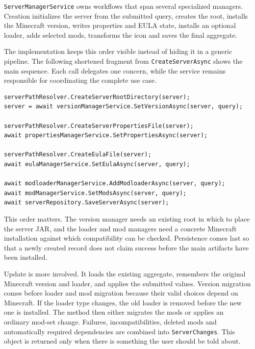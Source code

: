 \texttt{ServerManagerService} owns workflows that span several specialized managers. Creation initializes the server from the submitted query, creates the root, installs the Minecraft version, writes properties and EULA state, installs an optional loader, adds selected mods, transforms the icon and saves the final aggregate.

The implementation keeps this order visible instead of hiding it in a generic pipeline. The following shortened fragment from \texttt{CreateServerAsync} shows the main sequence. Each call delegates one concern, while the service remains responsible for coordinating the complete use case.

\begin{footnotesize}
\begin{verbatim}
serverPathResolver.CreateServerRootDirectory(server);
server = await versionManagerService.SetVersionAsync(server, query);

serverPathResolver.CreateServerPropertiesFile(server);
await propertiesManagerService.SetPropertiesAsync(server);

serverPathResolver.CreateEulaFile(server);
await eulaManagerService.SetEulaAsync(server, query);

await modloaderManagerService.AddModloaderAsync(server, query);
await modManagerService.SetModsAsync(server, query);
await serverRepository.SaveServerAsync(server);
\end{verbatim}
\end{footnotesize}

This order matters. The version manager needs an existing root in which to place the server JAR, and the loader and mod managers need a concrete Minecraft installation against which compatibility can be checked. Persistence comes last so that a newly created record does not claim success before the main artifacts have been installed.

Update is more involved. It loads the existing aggregate, remembers the original Minecraft version and loader, and applies the submitted values. Version migration comes before loader and mod migration because their valid choices depend on Minecraft. If the loader type changes, the old loader is removed before the new one is installed. The method then either migrates the mods or applies an ordinary mod-set change. Failures, incompatibilities, deleted mods and automatically required dependencies are combined into \texttt{ServerChanges}. This object is returned only when there is something the user should be told about.

